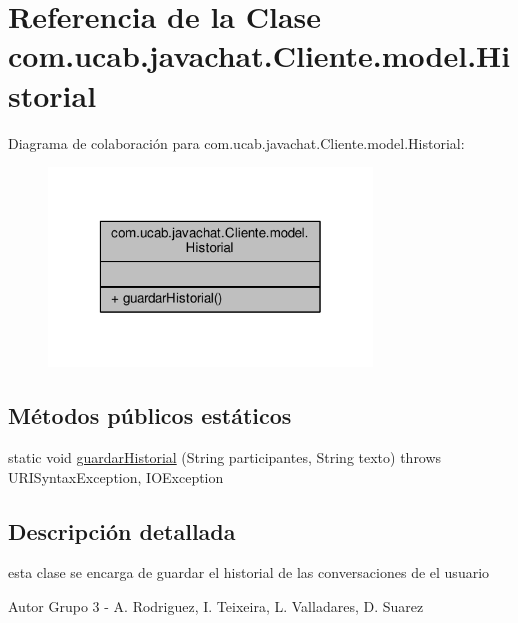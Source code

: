 \hypertarget{classcom_1_1ucab_1_1javachat_1_1_cliente_1_1model_1_1_historial}{\section{Referencia de la Clase com.\-ucab.\-javachat.\-Cliente.\-model.\-Historial}
\label{classcom_1_1ucab_1_1javachat_1_1_cliente_1_1model_1_1_historial}
}


Diagrama de colaboración para com.\-ucab.\-javachat.\-Cliente.\-model.\-Historial\-:
\nopagebreak
\begin{figure}[H]
\begin{center}
\leavevmode
\includegraphics[width=244pt]{d5/d81/classcom_1_1ucab_1_1javachat_1_1_cliente_1_1model_1_1_historial__coll__graph}
\end{center}
\end{figure}
\subsection*{Métodos públicos estáticos}
\begin{DoxyCompactItemize}
\item 
static void \hyperlink{classcom_1_1ucab_1_1javachat_1_1_cliente_1_1model_1_1_historial_a725a59214e66a362a82a05a7b37cfb48}{guardar\-Historial} (String participantes, String texto)  throws U\-R\-I\-Syntax\-Exception, I\-O\-Exception 
\end{DoxyCompactItemize}


\subsection{Descripción detallada}
esta clase se encarga de guardar el historial de las conversaciones de el usuario \begin{DoxyAuthor}{Autor}
Grupo 3 -\/ A. Rodriguez, I. Teixeira, L. Valladares, D. Suarez 
\end{DoxyAuthor}


